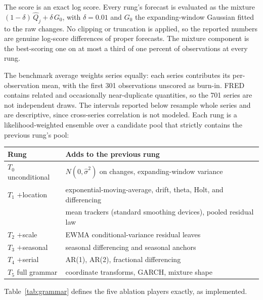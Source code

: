 \documentclass[11pt]{article}
\theoremstyle{remark}
\begin{document}
The score is an exact log score. Every rung's forecast is evaluated as the mixture
$(1-\delta)\,\widehat Q_j+\delta\,G_0$, with $\delta=0.01$ and $G_0$ the expanding-window
Gaussian fitted to the raw changes. No clipping or truncation is applied, so the reported
numbers are genuine log-score differences of proper forecasts. The mixture component is the
best-scoring one on at most a third of one percent of observations at every rung.

The benchmark average weights series equally: each series contributes its per-observation
mean, with the first 301 observations unscored as burn-in. FRED contains related and occasionally near-duplicate
quantities, so the 701 series are not independent draws. The intervals reported below
resample whole series and are descriptive, since cross-series correlation is not modeled. Each rung is a likelihood-weighted ensemble over a candidate pool that strictly
contains the previous rung's pool:

\begin{center}
\small
\begin{tabular}{ll}
\toprule
Rung & Adds to the previous rung\\
\midrule
$T_0$ unconditional & $N(0,\hat\sigma^2)$ on changes, expanding-window variance\\
$T_1$ $+$location & exponential-moving-average, drift, theta, Holt, and differencing\\
 & \quad mean trackers (standard smoothing devices), pooled residual law\\
$T_2$ $+$scale & EWMA conditional-variance residual leaves\\
$T_3$ $+$seasonal & seasonal differencing and seasonal anchors\\
$T_4$ $+$serial & AR(1), AR(2), fractional differencing\\
$T_5$ full grammar & coordinate transforms, GARCH, mixture shape\\
\bottomrule
\end{tabular}
\end{center}

Table~\ref{tab:grammar} defines the five ablation players exactly, as implemented.
\end{document}

